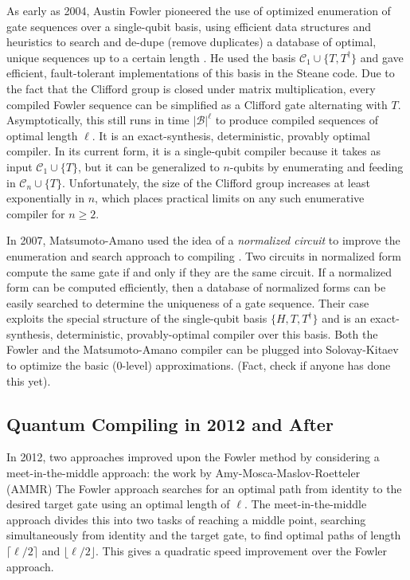 
As early as 2004, Austin Fowler pioneered the use of optimized enumeration
of gate sequences over a single-qubit basis, using efficient data structures
and heuristics to search and de-dupe (remove duplicates) a database of optimal, unique
sequences up to
a certain length \cite{Fowler2011}. He used the basis $\mathcal{C}_1 \cup \{ T, T^{\dagger} \}$
and gave efficient, fault-tolerant implementations of this basis in the
Steane code. Due to the fact that the Clifford group is closed under
matrix multiplication, every compiled Fowler sequence can be simplified as a
Clifford gate alternating with $T$. Asymptotically, this still runs in time
$|\mathcal{B}|^\ell$ to produce compiled sequences of optimal length $\ell$.
It is an exact-synthesis, deterministic, provably optimal compiler.
In its current form, it is a single-qubit compiler because it takes as input
$\mathcal{C}_1 \cup \{T\}$, but it can be generalized to $n$-qubits by enumerating
and feeding in $\mathcal{C}_n \cup \{T\}$. Unfortunately, the size of the
Clifford group increases at least exponentially in $n$, which places practical
limits on any such enumerative compiler for $n \ge 2$.

In 2007, Matsumoto-Amano used the idea of a \emph{normalized circuit} to
improve the enumeration and search approach to compiling \cite{Matsumoto2007}. Two circuits in
normalized form compute the same gate if and only if they are the same
circuit. If a normalized form can be computed efficiently, then a
database of normalized forms can be easily searched to determine the
uniqueness of a gate sequence. Their case exploits the special structure
of the single-qubit basis $\{H,T,T^{\dagger}\}$ and is an exact-synthesis,
deterministic, provably-optimal compiler over this basis. Both the Fowler
and the Matsumoto-Amano compiler can be plugged into Solovay-Kitaev to
optimize the basic (0-level) approximations. (Fact, check if anyone
has done this yet).

\subsection{Quantum Compiling in 2012 and After}
\label{subsec:qcompiile-post2012}

In 2012, two approaches improved upon the Fowler method by considering a
meet-in-the-middle approach: the work by Amy-Mosca-Maslov-Roetteler (AMMR) The Fowler approach searches for an
optimal path from identity to the desired target gate using an optimal
length of $\ell$. The meet-in-the-middle approach divides this into two tasks of
reaching a middle point, searching simultaneously from identity and the
target gate, to find optimal paths of length $\lceil \ell/2 \rceil$
and $\lfloor \ell/2 \rfloor$. This gives a quadratic speed improvement over
the Fowler approach.


